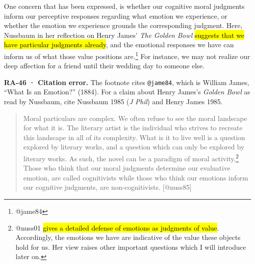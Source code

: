 \documentclass[
  letterpaper,
  DIV=11,
  numbers=noendperiod]{scrartcl}
\theoremstyle{remark}
\begin{document}
One concern that has been expressed, is whether our cognitive moral
judgments inform our perceptive responses regarding what emotion we
experience, or whether the emotion we experience grounds the
corresponding judgment. Here, Nussbaum in her reflection on Henry James'
\emph{The Golden Bowl} \hl{suggests that we have particular judgments
already}, and the emotional responses we have can inform us of what
those value positions are.\footnote{@jame84} For instance, we may not
realize our deep affection for a friend until their wedding day to
someone else.

\begin{tcolorbox}[enhanced jigsaw, arc=.35mm, bottomrule=.15mm, bottomtitle=1mm, breakable, colback=white, colbacktitle=quarto-callout-warning-color!10!white, colframe=quarto-callout-warning-color-frame, coltitle=black, left=2mm, leftrule=.75mm, opacityback=0, opacitybacktitle=0.6, rightrule=.15mm, title=\textcolor{quarto-callout-warning-color}{\faExclamationTriangle}\hspace{0.5em}{Warning}, titlerule=0mm, toprule=.15mm, toptitle=1mm]

\textbf{RA-46 · Citation error.} The footnote cites \texttt{@jame84},
which is William James, ``What Is an Emotion?'' (1884). For a claim
about Henry James's \emph{Golden Bowl} as read by Nussbaum, cite
Nussbaum 1985 (\emph{J Phil}) and Henry James 1985.

\end{tcolorbox}

\begin{quote}
Moral particulars are complex. We often refuse to see the moral
landscape for what it is. The literary artist is the individual who
strives to recreate this landscape in all of its complexity. What is it
to live well is a question explored by literary works, and a question
which can only be explored by literary works. As such, the novel can be
a paradigm of moral activity.\footnote{@nuss01 \hl{gives a detailed
  defense of emotions as judgments of value}. Accordingly, the emotions
  we have are indicative of the value these objects hold for us. Her
  view raises other important questions which I will introduce later on.}
Those who think that our moral judgments determine our evaluative
emotion, are called cognitivists while those who think our emotions
inform our cognitive judgments, are non-cognitivists. {[}@nuss85{]}
\end{quote}
\end{document}
